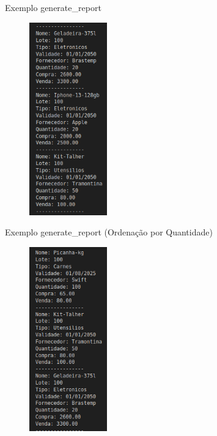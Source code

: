 \documentclass{beamer}
\begin{document}
\begin{frame}{Exemplo generate\_report}
    \begin{figure}
        \centering
        \includegraphics[width=0.3\textwidth]{img/relatorio-nome.png}
    \end{figure}
\end{frame}

\begin{frame}{Exemplo generate\_report (Ordenação por Quantidade)}
    \begin{figure}
        \centering
        \includegraphics[width=0.3\textwidth]{img/relatorio-quantidade.png}
    \end{figure}
\end{frame}
\end{document}
